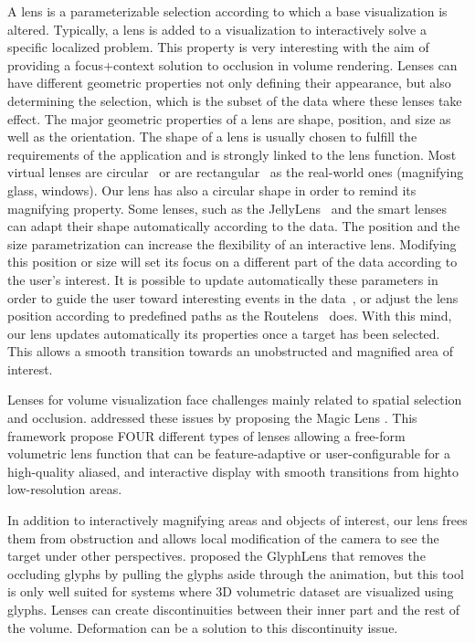 A lens is a parameterizable selection according to which a base visualization is altered. Typically, a lens is added to a visualization to interactively solve a specific localized problem. This property is very interesting with the aim of providing a focus+context solution to occlusion in volume rendering. Lenses can have different geometric properties not only defining their appearance, but also determining the selection, which is the subset of the data where these lenses take effect. The major geometric properties of a lens are shape, position, and size as well as the orientation.
The shape of a lens is usually chosen to fulfill the requirements of the application and is strongly linked to the lens function. Most virtual lenses are circular~\cite{1648236} or are rectangular~\cite{Kincaid:2010:SFA:1907651.1907963} as the real-world ones (magnifying glass, windows). Our lens has also a circular shape in order to remind its magnifying property. Some lenses, such as the  JellyLens~\cite{Pindat:2012:JCA:2380116.2380150} and the smart lenses~\cite{Thiede2008} can adapt their shape automatically according to the data. 
The position and the size parametrization can increase the flexibility of an interactive lens.
Modifying this position or size will set its focus on a different part of the data according to the user's interest. It is possible to update automatically these parameters in order to guide the user toward interesting events in the data~\cite{Tominski:2011:ECU:2336207.2336211}, or adjust the lens position according to predefined paths as the Routelens~\cite{Alvina:2014:RER:2598153.2598200} does. With this mind, our lens updates automatically its properties once a target has been selected. This allows a smooth transition towards an unobstructed and magnified area of interest. 

Lenses for volume visualization face challenges mainly related to spatial selection and occlusion. \cite{1532818} addressed these issues by proposing the Magic Lens . This framework propose FOUR different types of lenses allowing a free-form volumetric lens function that
can be feature-adaptive or user-configurable for a high-quality
aliased, and interactive display with smooth transitions from highto
low-resolution areas.


In addition to interactively magnifying areas and objects of interest, our lens frees them from obstruction and allows local modification of the camera to see the target under other perspectives. \cite{7539643} proposed the GlyphLens that removes the occluding glyphs by pulling the glyphs aside through the animation, but this tool is only well suited for systems where 3D volumetric dataset are visualized using glyphs. Lenses can create discontinuities between their inner part and the rest of the volume. Deformation can be a solution to this discontinuity issue.   




